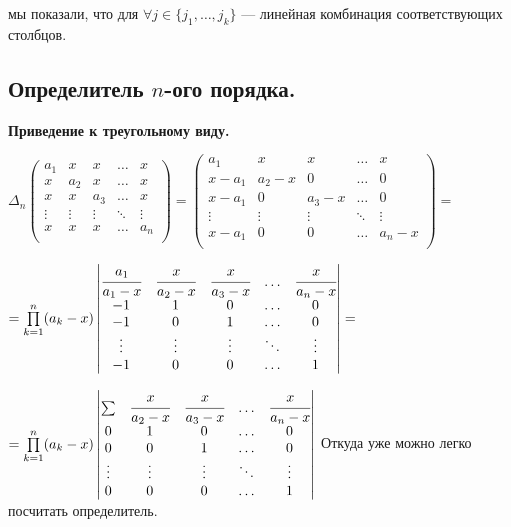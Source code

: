 мы показали, что для \(\forall j \in \{j_1,\ldots,j_k\}\) --- линейная комбинация  соответствующих столбцов. 


\subsection{Определитель \(n\)-ого порядка.}


\textbf{Приведение к треугольному виду.}

\( \Delta_n \begin{pmatrix}
a_1 & x & x & \ldots & x \\
x & a_2 & x & \ldots & x \\
x & x & a_3 & \ldots & x \\
\vdots & \vdots & \vdots & \ddots & \vdots \\
x & x & x & \ldots & a_n \\
\end{pmatrix}
=
\begin{pmatrix}
a_1 & x & x & \ldots & x \\
x-a_1 & a_2 - x & 0 & \ldots & 0 \\
x-a_1 & 0 & a_3 -x & \ldots & 0 \\
\vdots & \vdots & \vdots & \ddots & \vdots \\
x-a_1 & 0& 0 & \ldots & a_n-x \\
\end{pmatrix}
=\)


\( = 
\prod\limits_{k=1}^n (a_k-x)
\begin{vmatrix}
\cfrac{a_1}{a_1-x} & \cfrac{x}{a_2-x} & \cfrac{x}{a_3-x} & \ldots & \cfrac{x}{a_n-x} \\
-1 & 1 & 0 & \ldots & 0 \\
-1 & 0 & 1 & \ldots & 0 \\
\vdots & \vdots & \vdots & \ddots & \vdots \\
-1 & 0& 0 & \ldots & 1 \\
\end{vmatrix}
 = \)
 
 \(=
\prod\limits_{k=1}^n (a_k-x)
\begin{vmatrix}
\sum & \cfrac{x}{a_2-x} & \cfrac{x}{a_3-x} & \ldots & \cfrac{x}{a_n-x} \\
0 & 1 & 0 & \ldots & 0 \\
0 & 0 & 1 & \ldots & 0 \\
\vdots & \vdots & \vdots & \ddots & \vdots \\
0 & 0& 0 & \ldots & 1 \\
\end{vmatrix}
\)
 Откуда уже можно легко посчитать определитель.

